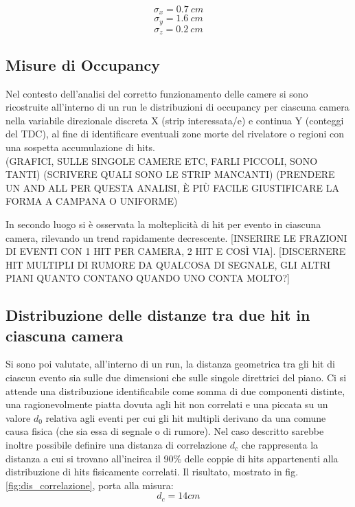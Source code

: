 \documentclass[8pt]{extarticle}
\begin{document}
\[ \sigma_x = 0.7 \ cm \]
\[ \sigma_y = 1.6 \ cm \]
\[ \sigma_z = 0.2 \ cm \]

\subsection{Misure di Occupancy}
Nel contesto dell'analisi del  corretto funzionamento delle camere si sono ricostruite all'interno di un run le distribuzioni di occupancy per ciascuna camera nella variabile direzionale discreta X (strip interessata/e) e continua Y (conteggi del TDC), al fine di identificare eventuali zone morte del rivelatore o regioni con una sospetta accumulazione di hits.\\
(GRAFICI, SULLE SINGOLE CAMERE ETC, FARLI PICCOLI, SONO TANTI)
(SCRIVERE QUALI SONO LE STRIP MANCANTI)
(PRENDERE UN AND ALL PER QUESTA ANALISI, È PIÙ FACILE GIUSTIFICARE LA FORMA A CAMPANA O UNIFORME)

In secondo luogo si è osservata la molteplicità di hit per evento in ciascuna camera, rilevando un trend rapidamente decrescente. [INSERIRE LE FRAZIONI DI EVENTI CON 1 HIT PER CAMERA, 2 HIT E COSÌ VIA]. 
[DISCERNERE HIT MULTIPLI DI RUMORE DA QUALCOSA DI SEGNALE, GLI ALTRI PIANI QUANTO CONTANO QUANDO UNO CONTA MOLTO?]

\subsection{Distribuzione delle distanze tra due hit in ciascuna camera} \label{subsec:dis_corr}
Si sono poi valutate, all'interno di un run, la distanza geometrica tra gli hit di ciascun evento  sia sulle due dimensioni che sulle singole direttrici del piano. Ci si attende una distribuzione identificabile come somma di due componenti distinte, una ragionevolmente piatta dovuta agli hit non correlati e una piccata su un valore $d_0$ relativa agli eventi per cui gli hit multipli derivano da una comune causa fisica (che sia essa di segnale o di rumore). 
Nel caso descritto sarebbe inoltre possibile definire una distanza di correlazione $d_c$ che rappresenta la distanza a cui si trovano all'incirca il 90\% delle coppie di hits appartenenti alla distribuzione di hits fisicamente correlati. Il risultato, mostrato in fig. \ref{fig:dis_correlazione}, porta alla misura: \\
\[ d_c = 14 cm \]
\end{document}
